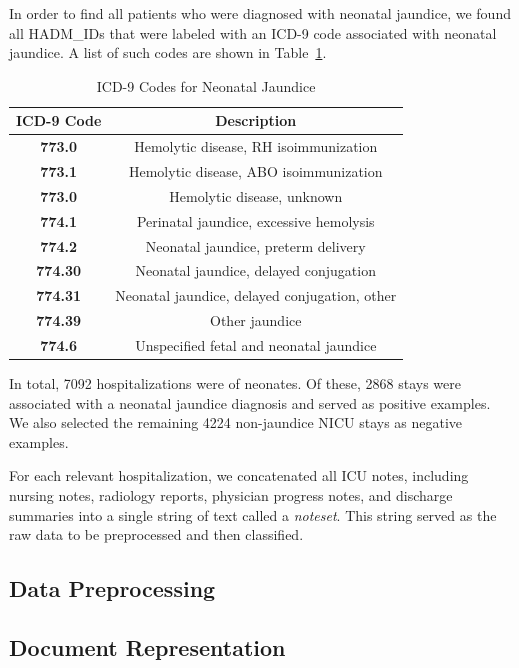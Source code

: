 \documentclass[conference]{IEEEtran}
\begin{document}
In order to find all patients who were diagnosed with neonatal jaundice, we found all HADM\_IDs that were labeled with an ICD-9 code associated with neonatal jaundice. A list of such codes are shown in Table~\ref{tab1}. 
\begin{table}[htbp]
\caption{ICD-9 Codes for Neonatal Jaundice}
\begin{center}
\begin{tabular}{cc}
\textbf{ICD-9 Code}&\textbf{Description} \\
\hline
\textbf{773.0} & Hemolytic disease, RH isoimmunization \\
\textbf{773.1} & Hemolytic disease, ABO isoimmunization \\
\textbf{773.0} & Hemolytic disease, unknown \\
\textbf{774.1} & Perinatal jaundice, excessive hemolysis \\
\textbf{774.2} & Neonatal jaundice, preterm delivery \\
\textbf{774.30} & Neonatal jaundice, delayed conjugation \\
\textbf{774.31} &  Neonatal jaundice, delayed conjugation, other \\
\textbf{774.39} & Other jaundice \\
\textbf{774.6} & Unspecified fetal and neonatal jaundice \\
\end{tabular}
\label{tab1}
\end{center}
\end{table}
In total, 7092 hospitalizations were of neonates. Of these, 2868 stays were associated with a neonatal jaundice diagnosis and served as positive examples. We also selected the remaining 4224 non-jaundice NICU stays as negative examples.

For each relevant hospitalization, we concatenated all ICU notes, including nursing notes, radiology reports, physician progress notes, and discharge summaries into a single string of text called a \textit{noteset}. This string served as the raw data to be preprocessed and then classified. 
\subsection{Data Preprocessing}\label{AA}

\subsection{Document Representation}\label{AA}
\end{document}
